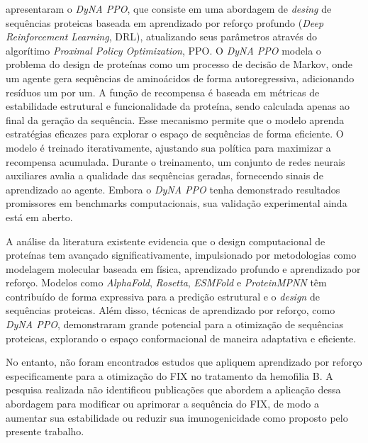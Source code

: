 \cite{DyNAPPO} apresentaram o \textit{DyNA PPO}, que consiste em uma
abordagem de \textit{desing} de sequências proteicas baseada em aprendizado por reforço profundo (\textit{Deep Reinforcement Learning}, DRL),
atualizando seus parâmetros através do algorítimo \textit{Proximal Policy Optimization}, PPO.  
O \textit{DyNA PPO} modela o problema do design de proteínas como um processo de decisão de Markov, 
onde um agente gera sequências de aminoácidos de forma autoregressiva, 
adicionando resíduos um por um. 
A função de recompensa é baseada em métricas de estabilidade estrutural e funcionalidade da proteína, 
sendo calculada apenas ao final da geração da sequência. 
Esse mecanismo permite que o modelo aprenda estratégias eficazes para explorar o espaço de sequências de forma eficiente.  
O modelo é treinado iterativamente, ajustando sua política para maximizar a recompensa acumulada.
Durante o treinamento, um conjunto de redes neurais auxiliares avalia a qualidade das sequências geradas,
fornecendo sinais de aprendizado ao agente. 
Embora o \textit{DyNA PPO} tenha demonstrado resultados promissores em benchmarks computacionais, 
sua validação experimental ainda está em aberto. 

A análise da literatura existente evidencia que o design computacional de proteínas tem avançado significativamente, 
impulsionado por metodologias como modelagem molecular baseada em física, aprendizado profundo e aprendizado por reforço. 
Modelos como \textit{AlphaFold}, \textit{Rosetta}, \textit{ESMFold} e \textit{ProteinMPNN} têm contribuído de forma expressiva
para a predição estrutural e o \textit{design} de sequências proteicas.
Além disso, técnicas de aprendizado por reforço, como \textit{DyNA PPO}, 
demonstraram grande potencial para a otimização de sequências proteicas, 
explorando o espaço conformacional de maneira adaptativa e eficiente.  

No entanto, não foram encontrados estudos que apliquem aprendizado 
por reforço especificamente para a otimização do FIX no tratamento da hemofilia B. 
A pesquisa realizada não identificou publicações que abordem a aplicação dessa abordagem para modificar ou aprimorar a sequência do FIX,
de modo a aumentar sua estabilidade ou reduzir sua imunogenicidade como proposto pelo presente trabalho. 
